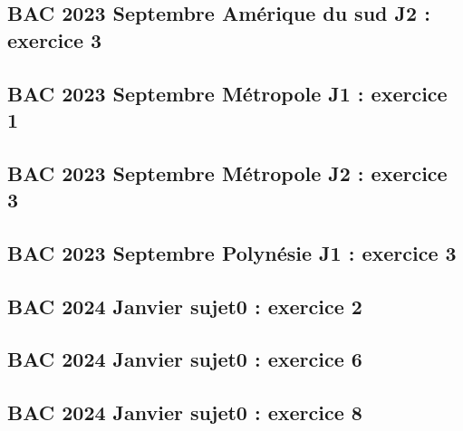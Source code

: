 \documentclass[lang=fr,edition=teacher,layout=sheet]{mxbook}
\begin{document}
\begingroup\endgroup
\par\bigskip
{}\subsection*{BAC 2023 Septembre Amérique du sud J2 : exercice 3}
\begingroup\endgroup
\par\bigskip
{}\subsection*{BAC 2023 Septembre Métropole J1 : exercice 1}
\begingroup\endgroup
\par\bigskip
{}\subsection*{BAC 2023 Septembre Métropole J2 : exercice 3}
\begingroup\endgroup
\par\bigskip
{}\subsection*{BAC 2023 Septembre Polynésie J1 : exercice 3}
\begingroup\endgroup
\par\bigskip
{}\subsection*{BAC 2024 Janvier sujet0 : exercice 2}
\begingroup\endgroup
\par\bigskip
{}\subsection*{BAC 2024 Janvier sujet0 : exercice 6}
\begingroup\endgroup
\par\bigskip
{}\subsection*{BAC 2024 Janvier sujet0 : exercice 8}
\end{document}
